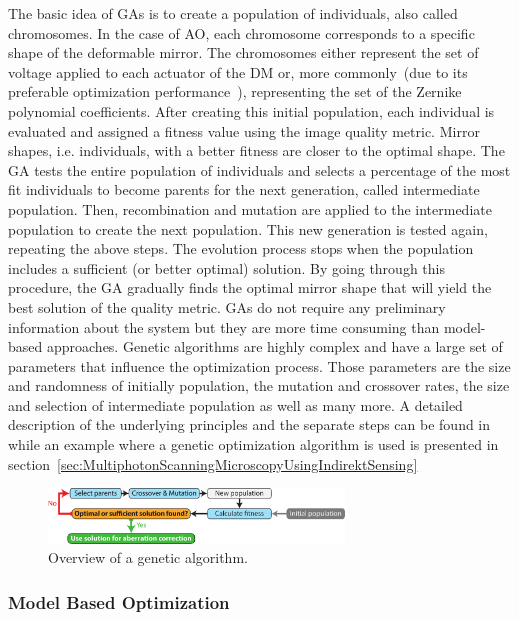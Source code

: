 The basic idea of GAs is to create a population of individuals, also called chromosomes. In the case of AO, each chromosome corresponds to a specific shape of the deformable mirror. The chromosomes either represent the set of voltage applied to each actuator of the DM or, more commonly~(due to its preferable optimization performance~\cite{Genetic_smart_algorithm}), representing the set of the Zernike polynomial coefficients. After creating this initial population, each individual is evaluated and assigned a fitness value using the image quality metric. Mirror shapes, i.e. individuals, with a better fitness are closer to the optimal shape. The GA tests the entire population of individuals and selects a percentage of the most fit individuals to become parents for the next generation, called intermediate population. Then, recombination and mutation are applied to the intermediate population to create the next population. This new generation is tested again, repeating the above steps. The evolution process stops when the population includes a sufficient (or better optimal) solution. By going through this procedure, the GA gradually finds the optimal mirror shape that will yield the best solution of the quality metric. GAs do not require any preliminary information about the system but they are more time consuming than model-based approaches. Genetic algorithms are highly complex and have a large set of parameters that influence the optimization process. Those parameters are the size and randomness of initially population, the mutation and crossover rates, the size and selection of intermediate population as well as many more. A detailed description of the underlying principles and the separate steps can be found in~\cite{Genetic_tutorial} while an example where a genetic optimization algorithm is used is presented in section~\ref{sec:MultiphotonScanningMicroscopyUsingIndirektSensing}

\begin{figure}[htbp]
	\centering
		\includegraphics[width=0.70\textwidth]{images/genetic_algorithm_overview.pdf}
	\caption{Overview of a genetic algorithm. }
	\label{fig:genetic_algorithm_overview}
\end{figure}


\subsubsection{Model Based Optimization}
\label{sec:ModelBasedSensing}

